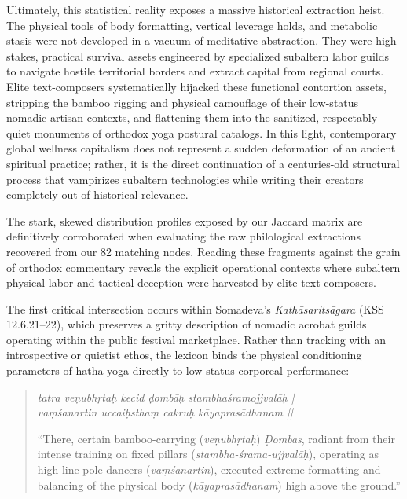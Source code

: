 \documentclass[11pt,twoside,letterpaper]{article}
\begin{document}
Ultimately, this statistical reality exposes a massive historical extraction heist. The physical tools of body formatting, vertical leverage holds, and metabolic stasis were not developed in a vacuum of meditative abstraction. They were high-stakes, practical survival assets engineered by specialized subaltern labor guilds to navigate hostile territorial borders and extract capital from regional courts. Elite text-composers systematically hijacked these functional contortion assets, stripping the bamboo rigging and physical camouflage of their low-status nomadic artisan contexts, and flattening them into the sanitized, respectably quiet monuments of orthodox yoga postural catalogs. In this light, contemporary global wellness capitalism does not represent a sudden deformation of an ancient spiritual practice; rather, it is the direct continuation of a centuries-old structural process that vampirizes subaltern technologies while writing their creators completely out of historical relevance.

The stark, skewed distribution profiles exposed by our Jaccard matrix are definitively corroborated when evaluating the raw philological extractions recovered from our 82 matching nodes. Reading these fragments against the grain of orthodox commentary reveals the explicit operational contexts where subaltern physical labor and tactical deception were harvested by elite text-composers. 

The first critical intersection occurs within Somadeva's \textit{Kathāsaritsāgara} (KSS 12.6.21--22), which preserves a gritty description of nomadic acrobat guilds operating within the public festival marketplace. Rather than tracking with an introspective or quietist ethos, the lexicon binds the physical conditioning parameters of hatha yoga directly to low-status corporeal performance:

\begin{quote}
\small
\textit{tatra veṇubhṛtaḥ kecid ḍombāḥ stambhaśramojjvalāḥ | \\
vaṃśanartin uccaiḥsthaṃ cakruḥ kāyaprasādhanam ||}
\medskip

``There, certain bamboo-carrying (\textit{veṇubhṛtaḥ}) \textit{Ḍombas}, radiant from their intense training on fixed pillars (\textit{stambha-śrama-ujjvalāḥ}), operating as high-line pole-dancers (\textit{vaṃśanartin}), executed extreme formatting and balancing of the physical body (\textit{kāyaprasādhanam}) high above the ground.''
\end{quote}
\end{document}
